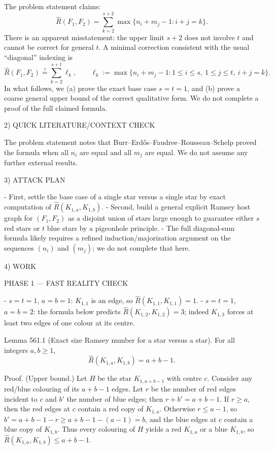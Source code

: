 The problem statement claims:
\[
\hat{R}(F_1,F_2)=\sum_{k=2}^{s+2} \max\{n_i+m_j-1: i+j=k\}.
\]
There is an apparent misstatement: the upper limit $s+2$ does not involve $t$ and cannot be correct for general $t$.
A minimal correction consistent with the usual ``diagonal'' indexing is
\[
\hat{R}(F_1,F_2)\stackrel{?}{=}\sum_{k=2}^{s+t} \ell_k,\qquad
\ell_k:= \max\{n_i+m_j-1: 1\le i\le s,\ 1\le j\le t,\ i+j=k\}.
\]
In what follows, we (a) prove the exact base case $s=t=1$, and (b) prove a coarse general upper bound of the correct qualitative form.
We do not complete a proof of the full claimed formula.

2) QUICK LITERATURE/CONTEXT CHECK

The problem statement notes that Burr--Erd\H{o}s--Faudree--Rousseau--Schelp proved the formula when all $n_i$ are equal and all $m_j$ are equal.
We do not assume any further external results.

3) ATTACK PLAN

- First, settle the base case of a single star versus a single star by exact computation of $\hat R(K_{1,a},K_{1,b})$.
- Second, build a general explicit Ramsey host graph for $(F_1,F_2)$ as a disjoint union of stars large enough to guarantee either $s$ red stars or $t$ blue stars by a pigeonhole principle.
- The full diagonal-sum formula likely requires a refined induction/majorization argument on the sequences $(n_i)$ and $(m_j)$; we do not complete that here.

4) WORK

PHASE 1 — FAST REALITY CHECK

- $s=t=1$, $a=b=1$: $K_{1,1}$ is an edge, so $\hat R(K_{1,1},K_{1,1})=1$.
- $s=t=1$, $a=b=2$: the formula below predicts $\hat R(K_{1,2},K_{1,2})=3$; indeed $K_{1,3}$ forces at least two edges of one colour at its centre.

Lemma 561.1 (Exact size Ramsey number for a star versus a star).
For all integers $a,b\ge 1$,
\[
\hat{R}(K_{1,a},K_{1,b})=a+b-1.
\]

Proof.
(Upper bound.) Let $H$ be the star $K_{1,a+b-1}$ with centre $c$.
Consider any red/blue colouring of its $a+b-1$ edges.
Let $r$ be the number of red edges incident to $c$ and $b'$ the number of blue edges; then $r+b'=a+b-1$.
If $r\ge a$, then the red edges at $c$ contain a red copy of $K_{1,a}$.
Otherwise $r\le a-1$, so $b'=a+b-1-r\ge a+b-1-(a-1)=b$, and the blue edges at $c$ contain a blue copy of $K_{1,b}$.
Thus every colouring of $H$ yields a red $K_{1,a}$ or a blue $K_{1,b}$, so $\hat{R}(K_{1,a},K_{1,b})\le a+b-1$.

